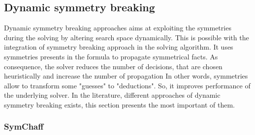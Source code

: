 %
%
%
%



% 


\subsection{Dynamic symmetry breaking}


Dynamic symmetry breaking approaches aims at exploiting the symmetries during the solving by altering search space dynamically. This is possible with the integration of symmetry breaking approach in the solving algorithm. It uses symmetries presents in the formula to propagate symmetrical facts.
As consequence, the solver reduces the number of decisions, that are chosen heuristically and increase the number of propagation
In other words, symmetries allow to transform some "guesses" to "deductions". So, it improves performance of the underlying solver.
In the literature, different approaches of dynamic symmetry breaking exists, this section presents the most important of them.


\subsubsection{SymChaff}

